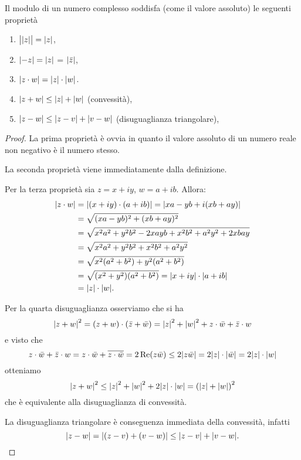 \begin{theorem}
Il modulo di un numero complesso soddisfa (come il valore assoluto)
le seguenti proprietà
\begin{enumerate}
\item $\big\lvert{\left|z\right|}\big\rvert = {\left|z\right|}$,
\item ${\left|-z\right|} = {\left|z\right|}$ = ${\left|\bar z\right|}$,
\item ${\left|z\cdot w\right|} = {\left|z\right|}\cdot{\left|w\right|}$.
\item ${\left|z+w\right|} \le {\left|z\right|}+{\left|w\right|}$ (convessità),
\item ${\left|z-w\right|} \le {\left|z-v\right|} + {\left|v-w\right|}$ (disuguaglianza triangolare),
\end{enumerate}
\end{theorem}
%
\begin{proof}
La prima proprietà è ovvia in quanto il valore assoluto di un numero reale
non negativo è il numero stesso.

La seconda proprietà viene immediatamente dalla definizione.

Per la terza proprietà sia $z=x+iy$, $w=a+ib$.
Allora:
\begin{align*}
{\left|z\cdot w\right|}
&= {\left|(x+iy)\cdot(a+ib)\right|}
={\left|xa - y b+ i(xb + ay)\right|} \\
&= \sqrt{(xa-yb)^2 + (xb+ay)^2}\\
&=\sqrt{x^2 a^2 + y^2b^2 - 2xayb + x^2b^2+a^2y^2+2xbay} \\
&=\sqrt{x^2 a^2 + y^2 b^2 + x^2 b^2 + a^2 y^2}\\
&=\sqrt{x^2(a^2+b^2) + y^2(a^2+b^2)}\\
&=\sqrt{(x^2+y^2)(a^2+b^2)}
={\left|x+iy\right|} \cdot {\left|a+ib\right|}\\
&={\left|z\right|}\cdot{\left|w\right|}.
\end{align*}

Per la quarta disuguaglianza osserviamo che si ha
\[
  {\left|z+w\right|}^2 = (z+w)\cdot(\bar z + \bar w)
  = {\left|z\right|}^2 + {\left|w\right|}^2 + z\cdot \bar w + \bar z \cdot w
\]
e visto che
\[
  z\cdot \bar w + \bar z \cdot w
  = z \cdot \bar w + \overline{z \cdot \bar w}
  = 2 \operatorname{Re}(z\bar w)
  \le 2 {\left|z\bar w\right|}
  = 2 {\left|z\right|}\cdot{\left|\bar w\right|}
  = 2 {\left|z\right|}\cdot{\left|w\right|}
\]
otteniamo
\[
 {\left|z+w\right|}^2 \le {\left|z\right|}^2+{\left|w\right|}^2 + 2 {\left|z\right|}\cdot{\left|w\right|}
 ={\left( {\left|z\right|} + {\left|w\right|} \right)}^2
\]
che è equivalente alla disuguaglianza di convessità.

La disuguaglianza triangolare è conseguenza immediata della convessità, infatti
\[
  {\left|z-w\right|} = {\left|(z-v) + (v-w)\right|}
  \le {\left|z-v\right|} + {\left|v-w\right|}.
\]
\end{proof}

